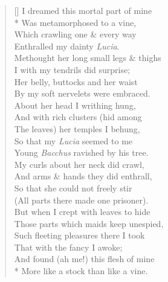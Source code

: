 \documentclass[MAIN]{subfiles}
\begin{document}
\settowidth{\versewidth}{I dreamed this mortal part of mine}
\begin{verse}[\versewidth]
I dreamed this mortal part of mine\\*
Was metamorphosed to a vine,\\
Which crawling one \& every way\\
Enthralled my dainty \emph{Lucia}.\\
Methought her long small legs \& thighs\\
I with my tendrils did surprise;\\
Her belly, buttocks and her waist\\
By my soft nervelets were embraced.\\
About her head I writhing hung,\\
And with rich clusters (hid among\\
The leaves) her temples I behung,\\
So that my \emph{Lucia} seemed to me\\
Young \emph{Bacchus} ravished by his tree.\\
My curls about her neck did crawl,\\
And arms \& hands they did enthrall,\\
So that she could not freely stir\\
(All parts there made one prisoner).\\
But when I crept with leaves to hide\\
Those parts which maids keep unespied,\\
Such fleeting pleasures there I took\\
That with the fancy I awoke;\\
And found (ah me!) this flesh of mine\\*
More like a stock than like a vine.
\end{verse}
\end{document}
